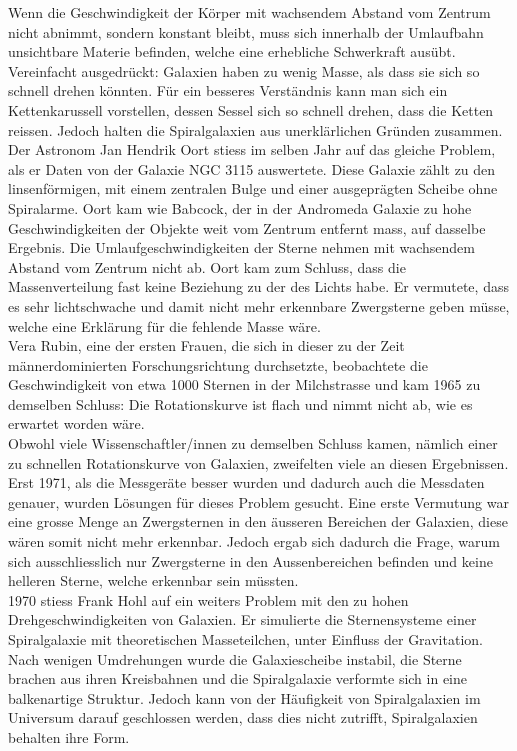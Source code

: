Wenn die Geschwindigkeit der Körper mit wachsendem Abstand vom Zentrum nicht abnimmt, sondern konstant bleibt, muss sich innerhalb der Umlaufbahn unsichtbare Materie befinden, welche eine erhebliche Schwerkraft ausübt. Vereinfacht ausgedrückt: Galaxien haben zu wenig Masse, als dass sie sich so schnell drehen könnten.
Für ein besseres Verständnis kann man sich ein Kettenkarussell vorstellen, dessen Sessel sich so schnell drehen, dass die Ketten reissen. Jedoch halten die Spiralgalaxien aus unerklärlichen Gründen zusammen.\\
Der Astronom Jan Hendrik Oort stiess im selben Jahr auf das gleiche Problem, als er Daten von der Galaxie NGC 3115 auswertete. Diese Galaxie zählt zu den linsenförmigen, mit einem zentralen Bulge und einer ausgeprägten Scheibe ohne Spiralarme.
Oort kam wie Babcock, der in der Andromeda Galaxie zu hohe Geschwindigkeiten der Objekte weit vom Zentrum entfernt mass, auf dasselbe Ergebnis. Die Umlaufgeschwindigkeiten der Sterne nehmen mit wachsendem Abstand vom Zentrum nicht ab. 
Oort kam zum Schluss, dass die Massenverteilung fast keine Beziehung zu der des Lichts habe. Er vermutete, dass es sehr lichtschwache und damit nicht mehr erkennbare Zwergsterne geben müsse, welche eine Erklärung für die fehlende Masse wäre.\\
Vera Rubin, eine der ersten Frauen, die sich in dieser zu der Zeit männerdominierten Forschungsrichtung durchsetzte, beobachtete die Geschwindigkeit von etwa 1000 Sternen in der Milchstrasse und kam 1965 zu demselben Schluss: Die Rotationskurve ist flach und nimmt nicht ab, wie es erwartet worden wäre.\\
Obwohl viele Wissenschaftler/innen zu demselben Schluss kamen, nämlich einer zu schnellen Rotationskurve von Galaxien, zweifelten viele an diesen Ergebnissen. Erst 1971, als die Messgeräte besser wurden und dadurch auch die Messdaten genauer, wurden Lösungen für dieses Problem gesucht. 
Eine erste Vermutung war eine grosse Menge an Zwergsternen in den äusseren Bereichen der Galaxien, diese wären somit nicht mehr erkennbar. Jedoch ergab sich dadurch die Frage, warum sich ausschliesslich nur Zwergsterne in den Aussenbereichen befinden und keine helleren Sterne, welche erkennbar sein müssten.\\
1970 stiess Frank Hohl auf ein weiters Problem mit den zu hohen Drehgeschwindigkeiten von Galaxien. Er simulierte die Sternensysteme einer Spiralgalaxie mit theoretischen Masseteilchen, unter Einfluss der Gravitation. 
Nach wenigen Umdrehungen wurde die Galaxiescheibe instabil, die Sterne brachen aus ihren Kreisbahnen und die Spiralgalaxie verformte sich in eine balkenartige Struktur. Jedoch kann von der Häufigkeit von Spiralgalaxien im Universum darauf geschlossen werden, dass dies nicht zutrifft, Spiralgalaxien behalten ihre Form.\\
